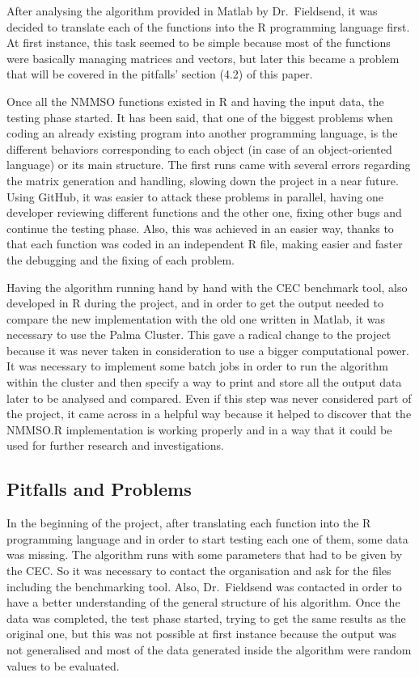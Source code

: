 \documentclass[12pt,a4paper]{article}
\begin{document}
After analysing the algorithm provided in Matlab by Dr.~Fieldsend, it
was decided to translate each of the functions into the R programming
language first. At first instance, this task seemed to be simple because
most of the functions were basically managing matrices and vectors, but
later this became a problem that will be covered in the pitfalls'
section (4.2) of this paper.

Once all the NMMSO functions existed in R and having the input data, the
testing phase started. It has been said, that one of the biggest
problems when coding an already existing program into another
programming language, is the different behaviors corresponding to each
object (in case of an object-oriented language) or its main structure.
The first runs came with several errors regarding the matrix generation
and handling, slowing down the project in a near future. Using GitHub,
it was easier to attack these problems in parallel, having one developer
reviewing different functions and the other one, fixing other bugs and
continue the testing phase. Also, this was achieved in an easier way,
thanks to that each function was coded in an independent R file, making
easier and faster the debugging and the fixing of each problem.

Having the algorithm running hand by hand with the CEC benchmark tool,
also developed in R during the project, and in order to get the output
needed to compare the new implementation with the old one written in
Matlab, it was necessary to use the Palma Cluster. This gave a radical
change to the project because it was never taken in consideration to use
a bigger computational power. It was necessary to implement some batch
jobs in order to run the algorithm within the cluster and then specify a
way to print and store all the output data later to be analysed and
compared. Even if this step was never considered part of the project, it
came across in a helpful way because it helped to discover that the
NMMSO.R implementation is working properly and in a way that it could be
used for further research and investigations.

\subsection{Pitfalls and Problems}\label{pitfalls-and-problems}

In the beginning of the project, after translating each function into
the R programming language and in order to start testing each one of
them, some data was missing. The algorithm runs with some parameters
that had to be given by the CEC. So it was necessary to contact the
organisation and ask for the files including the benchmarking tool.
Also, Dr.~Fieldsend was contacted in order to have a better
understanding of the general structure of his algorithm. Once the data
was completed, the test phase started, trying to get the same results as
the original one, but this was not possible at first instance because
the output was not generalised and most of the data generated inside the
algorithm were random values to be evaluated.
\end{document}
